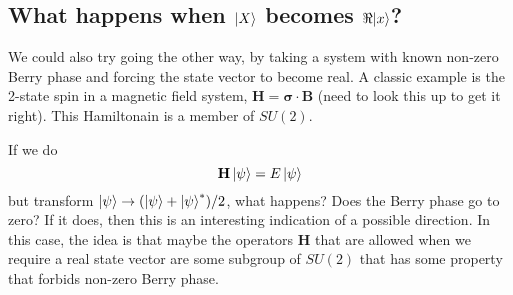 \documentclass[11pt]{article}
\begin{document}
\subsection{What happens when $\ket{X}$ becomes $\Re{\ket{x}}$?}
\label{sec:real_from_spin}

We could also try going the other way, by taking a system with known non-zero Berry phase and forcing the state vector to become real.
A classic example is the 2-state spin in a magnetic field system, $\mathbf{H} = \mathbf{\sigma} \cdot \mathbf{B}$ (need to look this up to get it right).
This Hamiltonain is a member of $SU(2)$.

If we do
\begin{equation}
  \label{eq:spin}
  \mathbf{H} \ket{\psi} = E \ket{\psi}
\end{equation}
but transform $\ket{\psi} \to (\ket{\psi} + \ket{\psi}^*)/2$, what happens?
Does the Berry phase go to zero?
If it does, then this is an interesting indication of a possible direction.
In this case, the idea is that maybe the operators $\mathbf{H}$ that are allowed when we require a real state vector are some subgroup of $SU(2)$ that has some property that forbids non-zero Berry phase.
\end{document}
